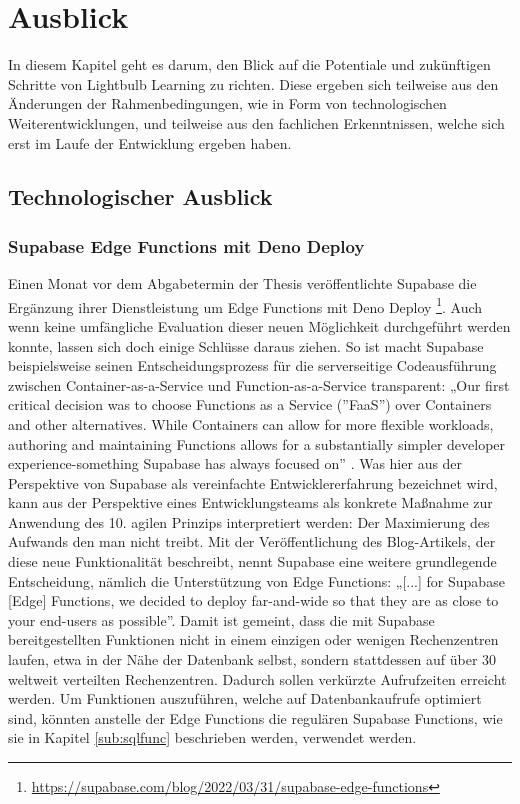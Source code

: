 \chapter{Ausblick}
In diesem Kapitel geht es darum, den Blick auf die Potentiale und zukünftigen Schritte von Lightbulb Learning zu richten. Diese ergeben sich teilweise aus den Änderungen der Rahmenbedingungen, wie in Form von technologischen Weiterentwicklungen, und teilweise aus den fachlichen Erkenntnissen, welche sich erst im Laufe der Entwicklung ergeben haben.

\section{Technologischer Ausblick}
\subsection{Supabase Edge Functions mit Deno Deploy}
Einen Monat vor dem Abgabetermin der Thesis veröffentlichte Supabase die Ergänzung ihrer Dienstleistung um Edge Functions mit Deno Deploy \footnote{\url{https://supabase.com/blog/2022/03/31/supabase-edge-functions}}. Auch wenn keine umfängliche Evaluation dieser neuen Möglichkeit durchgeführt werden konnte, lassen sich doch einige Schlüsse daraus ziehen. So ist macht Supabase beispielsweise seinen Entscheidungsprozess für die serverseitige Codeausführung zwischen Container-as-a-Service und Function-as-a-Service transparent: „Our first critical decision was to choose Functions as a Service (”FaaS”) over Containers and other alternatives. While Containers can allow for more flexible workloads, authoring and maintaining Functions allows for a substantially simpler developer experience-something Supabase has always focused on” \cite{Parameshwaren2022}. Was hier aus der Perspektive von Supabase als vereinfachte Entwicklererfahrung bezeichnet wird, kann aus der Perspektive eines Entwicklungsteams als konkrete Maßnahme zur Anwendung des 10. agilen Prinzips interpretiert werden: Der Maximierung des Aufwands den man nicht treibt. Mit der Veröffentlichung des Blog-Artikels, der diese neue Funktionalität beschreibt, nennt Supabase eine weitere grundlegende Entscheidung, nämlich die Unterstützung von Edge Functions: „[...] for Supabase [Edge] Functions, we decided to deploy far-and-wide so that they are as close to your end-users as possible”. Damit ist gemeint, dass die mit Supabase bereitgestellten Funktionen nicht in einem einzigen oder wenigen Rechenzentren laufen, etwa in der Nähe der Datenbank selbst, sondern stattdessen auf über 30 weltweit verteilten Rechenzentren. Dadurch sollen verkürzte Aufrufzeiten erreicht werden. Um Funktionen auszuführen, welche auf Datenbankaufrufe optimiert sind, könnten anstelle der Edge Functions die regulären Supabase Functions, wie sie in Kapitel \ref{sub:sqlfunc} beschrieben werden, verwendet werden.


